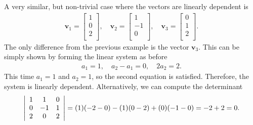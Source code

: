 A very similar, but non-trivial case where the vectors are linearly dependent is
\begin{align}
  \mathbf{v}_1 = \left[ \begin{array}{c} 1 \\  0 \\ 2 \\ \end{array} \right] , \quad
  \mathbf{v}_2 = \left[ \begin{array}{c} 1 \\ -1 \\ 0 \\ \end{array} \right] , \quad  
  \mathbf{v}_3 = \left[ \begin{array}{c} 0 \\  1 \\ 2 \\ \end{array} \right] . \label{Eqn:linearAlgebra_linearIndepndence_dependentVectors}
\end{align}
The only difference from the previous example is the vector $\mathbf{v}_3$. This can be simply shown by forming the linear system as before
\begin{align}
  a_1 = 1, \quad a_2 - a_1 = 0, \quad 2 a_2 = 2 . \nonumber
\end{align}
This time $a_1 = 1$ and $a_2 = 1$, so the second equation is satisfied. Therefore, the system is linearly dependent. Alternatively, we can compute the determinant
\begin{align}
  \left| \begin{array}{c c c}  
    1 &  1 &  0 \\
    0 & -1 &  1 \\
    2 &  0 &  2 \\ \end{array} \right| = (1)(-2 - 0) - (1)(0 - 2) + (0)( -1 - 0 ) = -2 + 2 = 0 . \nonumber
\end{align}

